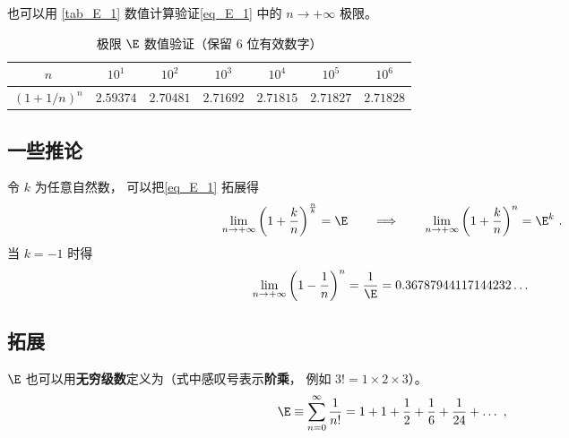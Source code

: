 也可以用 \autoref{tab_E_1} 数值计算验证\autoref{eq_E_1} 中的 $n\to+\infty$ 极限。
\begin{table}[ht]
\centering
\caption{极限 $\E$ 数值验证（保留 6 位有效数字）}\label{tab_E_1}
\begin{tabular}{|c|c|c|c|c|c|c|}
\hline
$n$ & $10^{1}$ & $10^{2}$ & $10^{3}$ & $10^{4}$ & $10^{5}$ & $10^{6}$ \\
\hline
$(1 + 1/n)^n$ & $2.59374$ & $2.70481$ & $2.71692$ & $2.71815$ & $2.71827$ & $2.71828$ \\
\hline
\end{tabular}
\end{table}

\subsection{一些推论}
令 $k$ 为任意自然数， 可以把\autoref{eq_E_1} 拓展得
\begin{equation}\label{eq_E_4}
\lim_{n \to +\infty} \left(1 + \frac{k}{n}\right)^{\frac{n}{k}} = \E
\qquad \Longrightarrow\qquad
\lim_{n \to +\infty} \left(1 + \frac{k}{n}\right)^n = \E^k~.
\end{equation}
当 $k = -1$ 时得
\begin{equation}\label{eq_E_3}
\lim_{n \to +\infty} \left(1 - \frac{1}{n}\right)^n = \frac{1}{\E} = 0.36787944117144232\dots~
\end{equation}

\subsection{拓展}
$\E$ 也可以用\textbf{无穷级数}定义为（式中感叹号表示\textbf{阶乘}， 例如 $3! = 1\times 2\times 3$）。
\begin{equation}
\E \equiv \sum_{n=0}^\infty \frac{1}{n!} = 1 + 1 + \frac{1}{2} + \frac{1}{6} + \frac{1}{24} +\dots~,
\end{equation}
